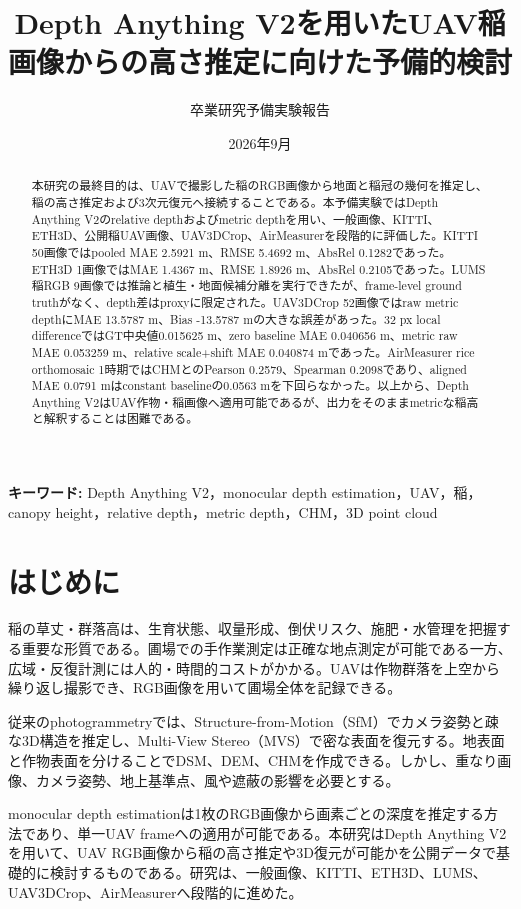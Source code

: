 \documentclass[a4paper,11pt]{ltjsarticle}
\title{\bfseries Depth Anything V2を用いたUAV稲画像からの高さ推定に向けた予備的検討}
\author{卒業研究予備実験報告}
\date{2026年9月}
\begin{document}
\maketitle
\begin{abstract}
本研究の最終目的は、UAVで撮影した稲のRGB画像から地面と稲冠の幾何を推定し、稲の高さ推定および3次元復元へ接続することである。本予備実験ではDepth Anything V2のrelative depthおよびmetric depthを用い、一般画像、KITTI、ETH3D、公開稲UAV画像、UAV3DCrop、AirMeasurerを段階的に評価した。KITTI 50画像ではpooled MAE 2.5921 m、RMSE 5.4692 m、AbsRel 0.1282であった。ETH3D 1画像ではMAE 1.4367 m、RMSE 1.8926 m、AbsRel 0.2105であった。LUMS稲RGB 9画像では推論と植生・地面候補分離を実行できたが、frame-level ground truthがなく、depth差はproxyに限定された。UAV3DCrop 52画像ではraw metric depthにMAE 13.5787 m、Bias -13.5787 mの大きな誤差があった。32 px local differenceではGT中央値0.015625 m、zero baseline MAE 0.040656 m、metric raw MAE 0.053259 m、relative scale+shift MAE 0.040874 mであった。AirMeasurer rice orthomosaic 1時期ではCHMとのPearson 0.2579、Spearman 0.2098であり、aligned MAE 0.0791 mはconstant baselineの0.0563 mを下回らなかった。以上から、Depth Anything V2はUAV作物・稲画像へ適用可能であるが、出力をそのままmetricな稲高と解釈することは困難である。
\end{abstract}
\noindent\textbf{キーワード:} Depth Anything V2，monocular depth estimation，UAV，稲，canopy height，relative depth，metric depth，CHM，3D point cloud
\tableofcontents
\clearpage
\section{はじめに}
稲の草丈・群落高は、生育状態、収量形成、倒伏リスク、施肥・水管理を把握する重要な形質である。圃場での手作業測定は正確な地点測定が可能である一方、広域・反復計測には人的・時間的コストがかかる。UAVは作物群落を上空から繰り返し撮影でき、RGB画像を用いて圃場全体を記録できる。

従来のphotogrammetryでは、Structure-from-Motion（SfM）でカメラ姿勢と疎な3D構造を推定し、Multi-View Stereo（MVS）で密な表面を復元する。地表面と作物表面を分けることでDSM、DEM、CHMを作成できる。しかし、重なり画像、カメラ姿勢、地上基準点、風や遮蔽の影響を必要とする。

monocular depth estimationは1枚のRGB画像から画素ごとの深度を推定する方法であり、単一UAV frameへの適用が可能である。本研究はDepth Anything V2を用いて、UAV RGB画像から稲の高さ推定や3D復元が可能かを公開データで基礎的に検討するものである。研究は、一般画像、KITTI、ETH3D、LUMS、UAV3DCrop、AirMeasurerへ段階的に進めた。
\end{document}
